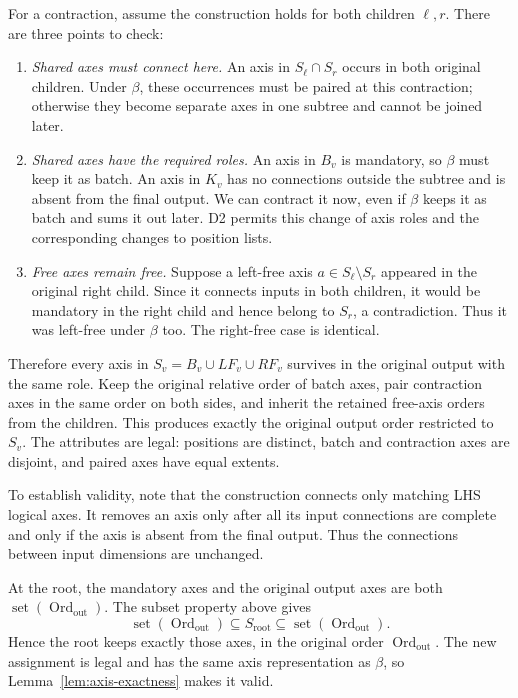 For a contraction, assume the construction holds for both children $\ell,r$.
There are three points to check:
\begin{enumerate}
\item \emph{Shared axes must connect here.}
An axis in $S_\ell\cap S_r$ occurs in both original children.
Under $\beta$, these occurrences must be paired at this contraction;
otherwise they become separate axes in one subtree and cannot be joined
later.
\item \emph{Shared axes have the required roles.}
An axis in $B_v$ is mandatory, so $\beta$ must keep it as batch.
An axis in $K_v$ has no connections outside the subtree and is absent
from the final output. We can contract it now, even if $\beta$ keeps
it as batch and sums it out later.
D2 permits this change of axis roles and the corresponding changes to
position lists.
\item \emph{Free axes remain free.}
Suppose a left-free axis $a\in S_\ell\setminus S_r$ appeared in the
original right child. Since it connects inputs in both children,
it would be mandatory in the right child and hence belong to $S_r$,
a contradiction. Thus it was left-free under $\beta$ too.
The right-free case is identical.
\end{enumerate}
Therefore every axis in $S_v=B_v\cup LF_v\cup RF_v$ survives in the
original output with the same role. Keep the original relative order
of batch axes, pair contraction axes in the same order on both sides,
and inherit the retained free-axis orders from the children.
This produces exactly the original output order restricted to $S_v$.
The attributes are legal: positions are distinct, batch and contraction
axes are disjoint, and paired axes have equal extents.

To establish validity, note that the construction connects only matching
LHS logical axes. It removes an
axis only after all its input connections are complete and only if the
axis is absent from the final output. Thus the connections between input dimensions
are unchanged.

At the root, the mandatory axes and the original output axes are both
$\operatorname{set}(\operatorname{Ord}_{\mathrm{out}})$. The subset property above gives
\begin{equation}
 \operatorname{set}(\operatorname{Ord}_{\mathrm{out}})\subseteq S_{\mathrm{root}}
 \subseteq\operatorname{set}(\operatorname{Ord}_{\mathrm{out}}).
\end{equation}
Hence the root keeps exactly those axes, in the original order $\operatorname{Ord}_{\mathrm{out}}$.
The new assignment is legal and has the same axis representation as
$\beta$, so Lemma~\ref{lem:axis-exactness} makes it valid.
